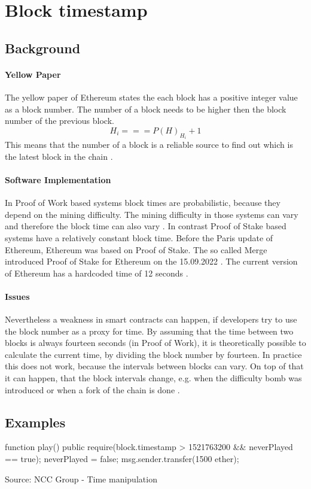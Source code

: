 \section{Block timestamp}

\subsection{Background}

\paragraph{Yellow Paper}
The yellow paper of Ethereum states the each block has a positive integer value as a block number.
The number of a block needs to be higher then the block number of the previous block.
\begin{equation} \label{eq:blocknumber}
    H_i === P(H)_{H_i} + 1
\end{equation}
This means that the number of a block is a reliable source to find out which is the latest block in the chain \cite{ethyellowpaper2023}.

\paragraph{Software Implementation}
In Proof of Work based systems block times are probabilistic, because they depend on the mining difficulty.
The mining difficulty in those systems can vary and therefore the block time can also vary \cite{eth_blocks}. \newline
In contrast Proof of Stake based systems have a relatively constant block time.
Before the Paris update of Ethereum, Ethereum was based on Proof of Stake. The so called Merge introduced Proof of Stake for Ethereum
on the 15.09.2022 \cite{eth_history}. The current version of Ethereum has a hardcoded time of 12 seconds \cite{eth_blocks}. \newline

\paragraph{Issues}
Nevertheless a weakness in smart contracts can happen, if developers try to use the block number as a proxy for time.
By assuming that the time between two blocks is always fourteen seconds (in Proof of Work), it is theoretically possible to
calculate the current time, by dividing the block number by fourteen. In practice this does not work,
because the intervals between blocks can vary. On top of that it can happen, that the
block intervals change, e.g. when the difficulty bomb was introduced or when a fork of the chain is done \cite{swc116}.

\subsection{Examples}
\begin{solidity}
    function play() public {
        require(block.timestamp > 1521763200 && neverPlayed == true);
        neverPlayed = false;
        msg.sender.transfer(1500 ether);
    }
\end{solidity}
Source: NCC Group - Time manipulation \cite{DASP2018}